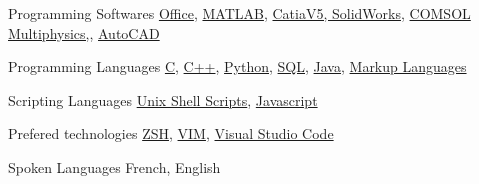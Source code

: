 

\begin{cvskills}

  \cvskill
    {Programming Softwares} %
    {\href{https://www.office.com/}{Office},
     \href{https://www.mathworks.com/}{MATLAB},
     \href{https://www.3ds.com/products-services/}{CatiaV5, SolidWorks},
     \href{https://www.comsol.com/}{COMSOL Multiphysics,},
     \href{https://www.autodesk.ca/en/products/autocad/overview}{AutoCAD}
    } %

  \cvskill
    {Programming Languages} %
    {\href{https://en.cppreference.com/w/c/languagehttps://en.cppreference.com/w/c/language}{C},
     \href{https://en.cppreference.com/w/cpp/language}{C++},
     \href{https://www.python.org/}{Python},
     \href{https://docs.oracle.com/en/database/other-databases/index.html}{SQL},
     \href{https://docs.oracle.com/en/java/index.html}{Java},
     \href{https://techterms.com/definition/markup_language}{Markup Languages}
    } %

  \cvskill
    {Scripting Languages} %
    {\href{https://www.gnu.org/software/bash/}{Unix Shell Scripts},
     \href{https://developer.oracle.com/ca-en/javascript/}{Javascript}
    }

  \cvskill
    {Prefered technologies} %
    {\href{http://zsh.sourceforge.net/}{ZSH},
     \href{https://www.vim.org/}{VIM},
     \href{https://code.visualstudio.com/}{Visual Studio Code}
    } %

  \cvskill
    {Spoken Languages} %
    {French, English} %

\end{cvskills}
